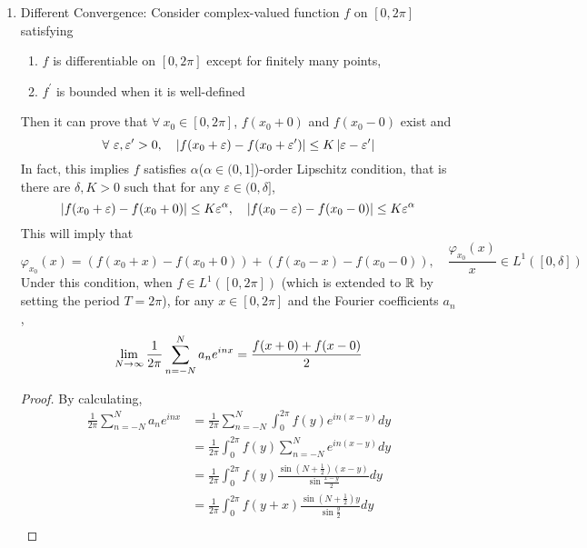 \begin{enumerate}[label=\arabic*.]
	\item Different Convergence: Consider complex-valued function $f$ on $[0,2\pi]$ satisfying
	\begin{enumerate}[label=(\arabic*)]
		\item $f$ is differentiable on $[0,2\pi]$ except for finitely many points,
		\item $f^\prime$ is bounded when it is well-defined
	\end{enumerate}
	Then it can prove that $\forall~x_0 \in [0,2\pi]$, $f(x_0+0)$ and $f(x_0-0)$ exist and
	\begin{equation*}
		\forall~\varepsilon,\varepsilon^\prime > 0,\quad \left\lvert f(x_0 + \varepsilon) - f(x_0 + \varepsilon^\prime)\right\lvert \leq K \left\lvert\varepsilon - \varepsilon^\prime\right\lvert
	\end{equation*}
	In fact, this implies $f$ satisfies $\alpha$($\alpha \in (0,1]$)-order Lipschitz condition, that is there are $\delta,K > 0$ such that for any $\varepsilon \in (0,\delta]$,
	\begin{equation*}
		\left\lvert f(x_0 + \varepsilon) - f(x_0 + 0)\right\lvert \leq K\varepsilon^\alpha,\quad \left\lvert f(x_0 - \varepsilon) - f(x_0 - 0)\right\lvert \leq K\varepsilon^\alpha
	\end{equation*}
	This will imply that
	\begin{equation}\label{eq:four_sum}
		\varphi_{x_0}(x) = (f(x_0 + x)-f(x_0 + 0)) + (f(x_0 - x)- f(x_0 - 0)),\quad \frac{\varphi_{x_0}(x)}{x} \in L^1([0,\delta])
	\end{equation}
	Under this condition, when $f \in L^1([0,2\pi])$ (which is extended to $\mathbb{R}$ by setting the period $T=2\pi$), for any $x \in [0,2\pi]$ and the Fourier coefficients $a_n$,
	\begin{equation*}
		\lim_{N \rightarrow \infty}\frac{1}{2\pi} \sum_{n = -N}^N a_ne^{inx} = \frac{f(x+0) + f(x-0)}{2}
	\end{equation*}
	\begin{proof}
		By calculating,
		\begin{equation*}
			\begin{aligned}
				\frac{1}{2\pi} \sum_{n = -N}^N a_ne^{inx} &= \frac{1}{2\pi} \sum_{n = -N}^N \int_0^{2\pi} f(y)e^{in(x-y)}dy \\
				&= \frac{1}{2\pi} \int_0^{2\pi} f(y)\sum_{n = -N}^Ne^{in(x-y)}dy \\
				&= \frac{1}{2\pi} \int_0^{2\pi} f(y)\frac{\sin(N+\frac{1}{2})(x-y)}{\sin \frac{x-y}{2}}dy \\
				&= \frac{1}{2\pi} \int_0^{2\pi} f(y+x)\frac{\sin(N+\frac{1}{2})y}{\sin \frac{y}{2}}dy \\

\end{aligned}
\end{equation*}
\end{proof}
\end{enumerate}
